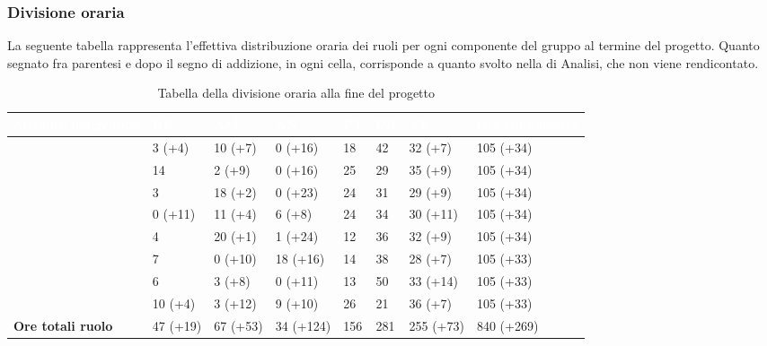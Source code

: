 \subsubsection{Divisione oraria}
La seguente tabella rappresenta l'effettiva distribuzione oraria dei ruoli per ogni componente del gruppo al termine del progetto. Quanto segnato fra parentesi e dopo il segno di addizione, in ogni cella, corrisponde a quanto svolto nella  di Analisi, che non viene rendicontato.
{
\renewcommand{\arraystretch}{2}
\begin{longtable}[h!] { C{3cm} C{1.4cm} C{1.4cm} C{1.6cm} C{0.9cm} C{0.9cm} C{1.6cm} C{2.3cm}}
\caption{Tabella della divisione oraria alla fine del progetto}\\

\textcolor{white}{\textbf{Membro del gruppo}} & 
\textcolor{white}{\textbf{RE}} & 
\textcolor{white}{\textbf{AM}} & 
\textcolor{white}{\textbf{AN}} & 
\textcolor{white}{\textbf{PT}} & 
\textcolor{white}{\textbf{PR}} & 
\textcolor{white}{\textbf{VE}} & 
\textcolor{white}{\textbf{Ore complessive}}\\	
\endhead
        
\MC{}                     &  3 (+4)  & 10 (+7)  &  0 (+16)  &  18 &  42 &  32 (+7)  & 105 (+34)  \\
\LD{}                     & 14       &  2 (+9)  &  0 (+16)  &  25 &  29 &  35 (+9)  & 105 (+34)  \\
\CE{}                     &  3       & 18 (+2)  &  0 (+23)  &  24 &  31 &  29 (+9)  & 105 (+34)  \\
\SE{}                     &  0 (+11) & 11 (+4)  &  6 (+8)   &  24 &  34 &  30 (+11) & 105 (+34)  \\
\PF{}                     &  4       & 20 (+1)  &  1 (+24)  &  12 &  36 &  32 (+9)  & 105 (+34)  \\
\DF{}                     &  7       &  0 (+10) & 18 (+16)  &  14 &  38 &  28 (+7)  & 105 (+33)  \\
\BR{}                     &  6       &  3 (+8)  &  0 (+11)  &  13 &  50 &  33 (+14) & 105 (+33)  \\
\AT{}                     & 10 (+4)  &  3 (+12) &  9 (+10)  &  26 &  21 &  36 (+7)  & 105 (+33)  \\
\textbf{Ore totali ruolo} & 47 (+19) & 67 (+53) & 34 (+124) & 156 & 281 & 255 (+73) & 840 (+269) \\
		
\end{longtable}
}


